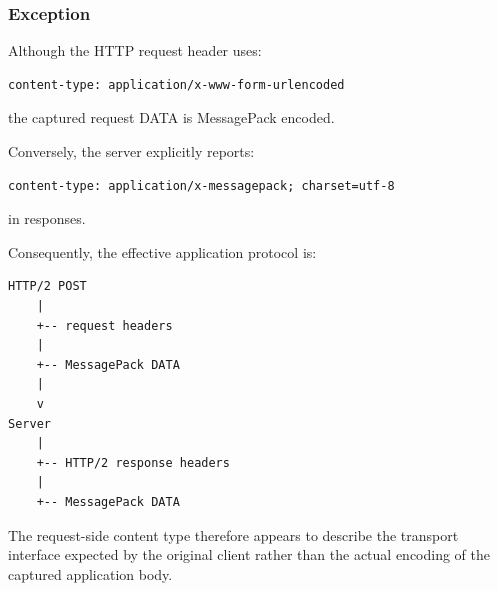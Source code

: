 \newpage

\subsubsection{Exception}

Although the HTTP request header uses:

\begin{lstlisting}
content-type: application/x-www-form-urlencoded
\end{lstlisting}

the captured request DATA is MessagePack encoded.

Conversely, the server explicitly reports:

\begin{lstlisting}
content-type: application/x-messagepack; charset=utf-8
\end{lstlisting}

in responses.

Consequently, the effective application protocol is:

\begin{lstlisting}
HTTP/2 POST
    |
    +-- request headers
    |
    +-- MessagePack DATA
    |
    v
Server
    |
    +-- HTTP/2 response headers
    |
    +-- MessagePack DATA
\end{lstlisting}

The request-side content type therefore appears to describe the transport
interface expected by the original client rather than the actual encoding
of the captured application body.

\newpage